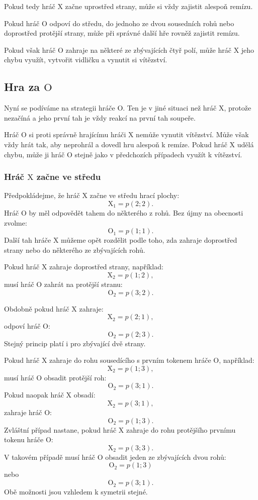 \documentclass[12pt,a4paper]{article}
\begin{document}
Pokud tedy hráč $\mathrm{X}$ začne uprostřed strany,
 může si vždy zajistit alespoň remízu.

Pokud hráč $\mathrm{O}$ odpoví do středu, 
do jednoho ze dvou sousedních rohů nebo doprostřed protější strany, 
může při správné další hře rovněž zajistit remízu.

Pokud však hráč $\mathrm{O}$ zahraje na některé ze zbývajících čtyř polí, 
může hráč $\mathrm{X}$ jeho chybu využít, vytvořit vidličku a vynutit si vítězství.

\subsection*{Hra za $\mathrm{O}$}

Nyní se podíváme na strategii hráče $\mathrm{O}$.
Ten je v jiné situaci než hráč $\mathrm{X}$, protože nezačíná 
a jeho první tah je vždy reakcí na první tah soupeře.

Hráč $\mathrm{O}$ si proti správně hrajícímu hráči $\mathrm{X}$ nemůže vynutit vítězství.
Může však vždy hrát tak, aby neprohrál a dovedl hru alespoň k remíze.
Pokud hráč $\mathrm{X}$ udělá chybu, 
může ji hráč $\mathrm{O}$ stejně jako v předchozích případech využít k vítězství.

\subsubsection*{Hráč $\mathrm{X}$ začne ve středu}

Předpokládejme, že hráč $\mathrm{X}$ začne ve středu hrací plochy:
\[
    \mathrm{X}_1=p(2;2).
\]
Hráč $\mathrm{O}$ by měl odpovědět tahem do některého z rohů.
Bez újmy na obecnosti zvolme:
\[
    \mathrm{O}_1=p(1;1).
\]
Další tah hráče $\mathrm{X}$ můžeme opět rozdělit podle toho, 
zda zahraje doprostřed strany nebo do některého ze zbývajících rohů.

Pokud hráč $\mathrm{X}$ zahraje doprostřed strany, například:
\[
    \mathrm{X}_2=p(1;2),
\]
musí hráč $\mathrm{O}$ zahrát na protější stranu:
\[
    \mathrm{O}_2=p(3;2).
\]

Obdobně pokud hráč $\mathrm{X}$ zahraje:
\[
    \mathrm{X}_2=p(2;1),
\]
odpoví hráč $\mathrm{O}$:
\[
    \mathrm{O}_2=p(2;3).
\]
Stejný princip platí i pro zbývající dvě strany.

Pokud hráč $\mathrm{X}$ zahraje do rohu sousedícího 
s prvním tokenem hráče $\mathrm{O}$, například:
\[
    \mathrm{X}_2=p(1;3),
\]
musí hráč $\mathrm{O}$ obsadit protější roh:
\[
    \mathrm{O}_2=p(3;1).
\]
Pokud naopak hráč $\mathrm{X}$ obsadí:
\[
    \mathrm{X}_2=p(3;1),
\]
zahraje hráč $\mathrm{O}$:
\[
    \mathrm{O}_2=p(1;3).
\]
Zvláštní případ nastane, pokud hráč $\mathrm{X}$ zahraje 
do rohu protějšího prvnímu tokenu hráče $\mathrm{O}$:
\[
    \mathrm{X}_2=p(3;3).
\]
V takovém případě musí hráč $\mathrm{O}$ obsadit jeden ze zbývajících dvou rohů:
\[
    \mathrm{O}_2=p(1;3)
\]
nebo
\[
    \mathrm{O}_2=p(3;1).
\]
Obě možnosti jsou vzhledem k symetrii stejné.
\end{document}
